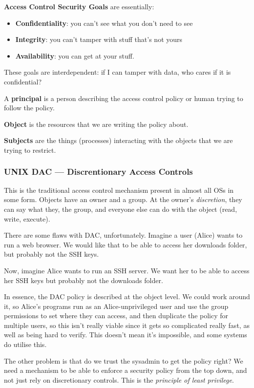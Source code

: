 \documentclass[11pt,a4paper,titlepage,dvipsnames,cmyk]{scrartcl}
\begin{document}
\textbf{Access Control Security Goals} are essentially:
\begin{itemize}
    \item \textbf{Confidentiality}: you can't see what you don't need to see
    \item \textbf{Integrity}: you can't tamper with stuff that's not yours
    \item \textbf{Availability}: you can get at your stuff.
\end{itemize}

These goals are interdependent: if I can tamper with data, who cares if it is confidential?

A \textbf{principal} is a person describing the access control policy or human trying to follow the policy.

\textbf{Object} is the resources that we are writing the policy about.

\textbf{Subjects} are the things (processes) interacting with the objects that we are trying to restrict.

\subsubsection{UNIX DAC --- Discrentionary Access Controls}
This is the traditional access control mechanism present in almost all OSs in some form. Objects have an owner and a group. At the owner's \textit{discretion}, they can say what they, the group, and everyone else can do with the object (read, write, execute).

There are some flaws with DAC, unfortunately. Imagine a user (Alice) wants to run a web browser. We would like that to be able to access her downloads folder, but probably not the SSH keys.

Now, imagine Alice wants to run an SSH server. We want her to be able to access her SSH keys but probably not the downloads folder.

In essence, the DAC policy is described at the object level. We could work around it, so Alice's programs run as an Alice-unprivileged user and use the group permissions to set where they can access, and then duplicate the policy for multiple users, so this isn't really viable since it gets so complicated really fast, as well as being hard to verify. This doesn't mean it's impossible, and some systems do utilise this.

The other problem is that do we trust the sysadmin to get the policy right? We need a mechanism to be able to enforce a security policy from the top down, and not just rely on discretionary controls. This is the \textit{principle of least privilege}.
\end{document}
